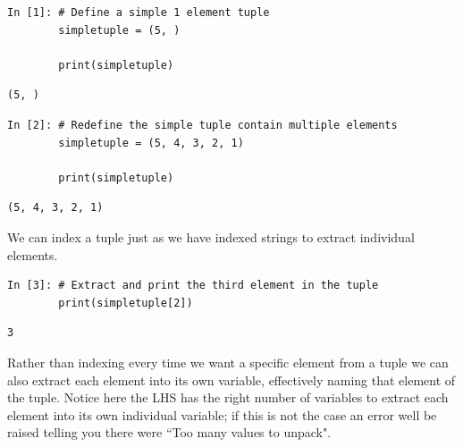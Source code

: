\begin{lstlisting}[style=PY] 
In [1]: # Define a simple 1 element tuple
        simpletuple = (5, )
        
        print(simpletuple)
\end{lstlisting}
\begin{lstlisting}[style=PY_out]
        (5, )
\end{lstlisting}
\begin{lstlisting}[style=PY]
In [2]: # Redefine the simple tuple contain multiple elements
        simpletuple = (5, 4, 3, 2, 1)
        
        print(simpletuple)
\end{lstlisting}
\begin{lstlisting}[style=PY_out]
        (5, 4, 3, 2, 1)
\end{lstlisting}
We can index a tuple just as we have indexed strings to extract individual elements.
\begin{lstlisting}[style=PY]
In [3]: # Extract and print the third element in the tuple
        print(simpletuple[2])
\end{lstlisting}
\begin{lstlisting}[style=PY_out]
        3
\end{lstlisting}
Rather than indexing every time we want a specific element from a tuple we can also extract each element into its own variable, effectively naming that element of the tuple. Notice here the LHS has the right number of variables to extract each element into its own individual variable; if this is not the case an error well be raised telling you there were ``Too many values to unpack".\\

